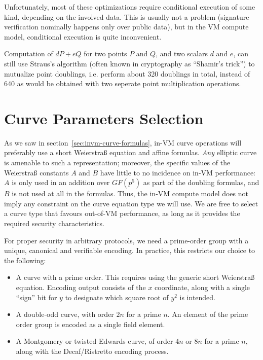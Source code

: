 \documentclass{llncs}
\newcommand{\GF}{GF}
\begin{document}
Unfortunately, most of these optimizations require conditional execution
of some kind, depending on the involved data. This is usually not a
problem (signature verification nominally happens only over public
data), but in the VM compute model, conditional execution is quite
inconvenient.

Computation of $d P + e Q$ for two points $P$ and $Q$, and two scalars
$d$ and $e$, can still use Straus's algorithm\cite{Str1964} (often known
in cryptography as ``Shamir's trick'') to mutualize point doublings,
i.e. perform about 320 doublings in total, instead of 640 as would be
obtained with two seperate point multiplication operations.

\section{Curve Parameters Selection}

As we saw in section~\ref{sec:invm-curve-formulas}, in-VM curve
operations will preferably use a short Weierstraß equation and affine
formulas. \emph{Any} elliptic curve is amenable to such a
representation; moreover, the specific values of the Weierstraß
constants $A$ and $B$ have little to no incidence on in-VM performance:
$A$ is only used in an addition over $\GF(p^5)$ as part of the doubling
formulas, and $B$ is not used at all in the formulas. Thus, the in-VM
compute model does not imply any constraint on the curve equation type
we will use. We are free to select a curve type that favours out-of-VM
performance, as long as it provides the required security
characteristics.

For proper security in arbitrary protocols, we need a prime-order group
with a unique, canonical and verifiable encoding\cite{CreJac2019}. In
practice, this restricts our choice to the following:
\begin{itemize}

    \item A curve with a prime order. This requires using the generic
    short Weierstraß equation. Encoding output consists of the $x$
    coordinate, along with a single ``sign'' bit for $y$ to designate
    which square root of $y^2$ is intended.

    \item A double-odd curve\cite{Por2020-4}, with order $2n$ for a
    prime $n$. An element of the prime order group is encoded as
    a single field element.

    \item A Montgomery or twisted Edwards curve, of order $4n$ or $8n$
    for a prime $n$, along with the Decaf/Ristretto encoding
    process\cite{Ham2015,RistrettoWeb}.

\end{itemize}
\end{document}
